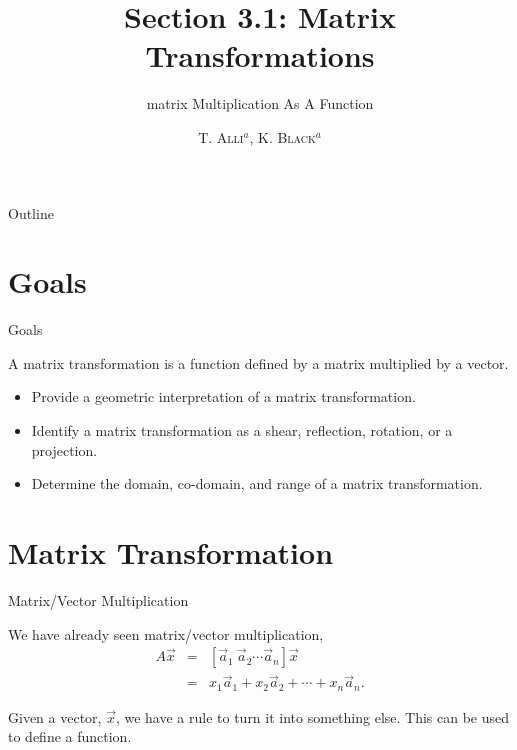 \documentclass[svgnames,table,,aspectratio=169]{beamer}
\begin{document}
\author{\textsc{T. Alli$^{a}$, K. Black$^{a}$}}
\subject{Linear Algebra}


\title{Section 3.1: Matrix Transformations}
\subtitle{matrix Multiplication As A Function}


\date{} %

\begin{frame}
  \titlepage
\end{frame}

\begin{frame}{Outline}
  \tableofcontents
\end{frame}


\section{Goals}

\begin{frame}{Goals}

  A matrix transformation is a function defined by a matrix multiplied
  by a vector.
  
  \begin{itemize}
  \item Provide a geometric interpretation of a matrix transformation.
  \item Identify a matrix transformation as a shear, reflection,
    rotation, or a projection.
  \item Determine the domain, co-domain, and range of a matrix transformation.
  \end{itemize}

\end{frame}

\section{Matrix Transformation}

\begin{frame}{Matrix/Vector Multiplication}

  We have already seen matrix/vector multiplication,
  \begin{eqnarray*}
    A\vec{x} & = & \left[ \vec{a}_1 ~ \vec{a}_2 \cdots \vec{a}_n  \right] \vec{x} \\
             & = & x_1 \vec{a}_1 + x_2 \vec{a}_2 + \cdots + x_n \vec{a}_n.
  \end{eqnarray*}

  Given a vector, $\vec{x}$, we have a rule to turn it into something
  else. This can be used to define a function.

\end{frame}
\end{document}
